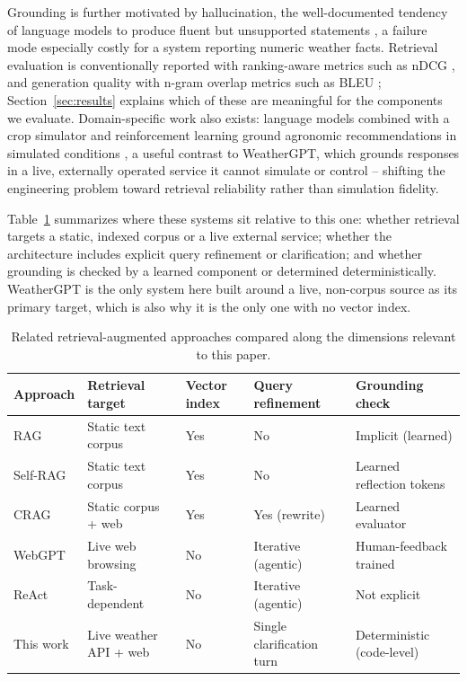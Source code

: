\documentclass[sigconf,natbib=true,anonymous=true]{acmart}
\begin{document}
Grounding is further motivated by hallucination, the well-documented tendency of language models to produce fluent but unsupported statements \citep{ji2023hallucination}, a failure mode especially costly for a system reporting numeric weather facts. Retrieval evaluation is conventionally reported with ranking-aware metrics such as nDCG \citep{jarvelin2002ndcg}, and generation quality with n-gram overlap metrics such as BLEU \citep{papineni2002bleu}; Section~\ref{sec:results} explains which of these are meaningful for the components we evaluate. Domain-specific work also exists: language models combined with a crop simulator and reinforcement learning ground agronomic recommendations in simulated conditions \citep{wu2024agronomists}, a useful contrast to WeatherGPT, which grounds responses in a live, externally operated service it cannot simulate or control -- shifting the engineering problem toward retrieval reliability rather than simulation fidelity.

Table~\ref{tab:related} summarizes where these systems sit relative to this one: whether retrieval targets a static, indexed corpus or a live external service; whether the architecture includes explicit query refinement or clarification; and whether grounding is checked by a learned component or determined deterministically. WeatherGPT is the only system here built around a live, non-corpus source as its primary target, which is also why it is the only one with no vector index.

\begin{table}[htbp]
  \centering
  \caption{Related retrieval-augmented approaches compared along the dimensions relevant to this paper.}
  \label{tab:related}
  \scriptsize
  \begin{tabular}{p{1.5cm}p{1.7cm}p{0.7cm}p{1.1cm}p{1.5cm}}
    \toprule
    \textbf{Approach} & \textbf{Retrieval target} & \textbf{Vector index} & \textbf{Query refine\-ment} & \textbf{Grounding check} \\
    \midrule
    RAG \citep{lewis2020rag} & Static text corpus & Yes & No & Implicit (learned) \\
    Self-RAG \citep{asai2024selfrag} & Static text corpus & Yes & No & Learned reflection tokens \\
    CRAG \citep{yan2024crag} & Static corpus + web & Yes & Yes (rewrite) & Learned evaluator \\
    WebGPT \citep{nakano2021webgpt} & Live web browsing & No & Iterative (agentic) & Human-feedback trained \\
    ReAct \citep{yao2023react} & Task-dependent & No & Iterative (agentic) & Not explicit \\
    This work & Live weather API + web & No & Single clarification turn & Deterministic (code-level) \\
    \bottomrule
  \end{tabular}
\end{table}
\end{document}
